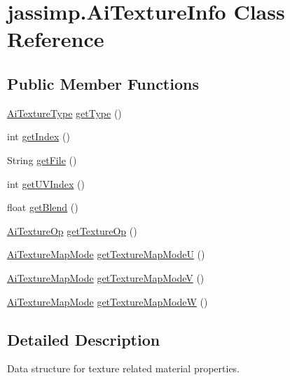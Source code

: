 \hypertarget{classjassimp_1_1_ai_texture_info}{\section{jassimp.\+Ai\+Texture\+Info Class Reference}
\label{classjassimp_1_1_ai_texture_info}
}
\subsection*{Public Member Functions}
\begin{DoxyCompactItemize}
\item 
\hyperlink{enumjassimp_1_1_ai_texture_type}{Ai\+Texture\+Type} \hyperlink{classjassimp_1_1_ai_texture_info_a4e9740899b0e0ad08eb30831b6e17fc8}{get\+Type} ()
\item 
int \hyperlink{classjassimp_1_1_ai_texture_info_adf60468562936ab8ff48cd53ae2c8047}{get\+Index} ()
\item 
String \hyperlink{classjassimp_1_1_ai_texture_info_ae50dc0898dde305bf885392034e94b03}{get\+File} ()
\item 
int \hyperlink{classjassimp_1_1_ai_texture_info_a7f99d5ae19bb34fd2d6809a6fa1e6189}{get\+U\+V\+Index} ()
\item 
float \hyperlink{classjassimp_1_1_ai_texture_info_a93a7417bcfbb777a444e9c247e5b0058}{get\+Blend} ()
\item 
\hyperlink{enumjassimp_1_1_ai_texture_op}{Ai\+Texture\+Op} \hyperlink{classjassimp_1_1_ai_texture_info_a4aebecf7db98ab42338684ae82689795}{get\+Texture\+Op} ()
\item 
\hyperlink{enumjassimp_1_1_ai_texture_map_mode}{Ai\+Texture\+Map\+Mode} \hyperlink{classjassimp_1_1_ai_texture_info_a12a037010fa91379d4e7a56e11f341f2}{get\+Texture\+Map\+Mode\+U} ()
\item 
\hyperlink{enumjassimp_1_1_ai_texture_map_mode}{Ai\+Texture\+Map\+Mode} \hyperlink{classjassimp_1_1_ai_texture_info_a46eea43804ed764cc5379d3f7fa1c0d7}{get\+Texture\+Map\+Mode\+V} ()
\item 
\hyperlink{enumjassimp_1_1_ai_texture_map_mode}{Ai\+Texture\+Map\+Mode} \hyperlink{classjassimp_1_1_ai_texture_info_a93c5ff968ff819e9393e526cb6f9ce3f}{get\+Texture\+Map\+Mode\+W} ()
\end{DoxyCompactItemize}


\subsection{Detailed Description}
Data structure for texture related material properties. 

